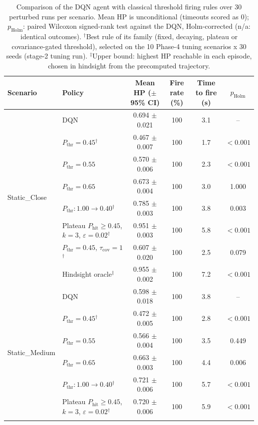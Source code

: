 \begin{table}[htbp]
\centering
\caption{Comparison of the DQN agent with classical threshold firing rules over 30 perturbed runs per scenario. Mean HP is unconditional (timeouts scored as 0); $p_{\mathrm{Holm}}$: paired Wilcoxon signed-rank test against the DQN, Holm-corrected (n/a: identical outcomes). $^{\dagger}$Best rule of its family (fixed, decaying, plateau or covariance-gated threshold), selected on the 10 Phase-4 tuning scenarios x 30 seeds (stage-2 tuning run). $^{\ddagger}$Upper bound: highest HP reachable in each episode, chosen in hindsight from the precomputed trajectory.}
\label{tab:comparison-traditional-rl}
\small
\begin{tabular}{llcccc}
\toprule
\textbf{Scenario} & \textbf{Policy} & \textbf{Mean HP ($\pm$95\% CI)} & \textbf{Fire rate (\%)} & \textbf{Time to fire (s)} & $p_{\mathrm{Holm}}$ \\
\midrule
\multirow{8}{*}{Static\_Close} & DQN & 0.694 $\pm$ 0.021 & 100 & 3.1 & -- \\
 & $P_{\mathrm{thr}}=0.45$$^{\dagger}$ & 0.467 $\pm$ 0.007 & 100 & 1.7 & $<0.001$ \\
 & $P_{\mathrm{thr}}=0.55$ & 0.570 $\pm$ 0.006 & 100 & 2.3 & $<0.001$ \\
 & $P_{\mathrm{thr}}=0.65$ & 0.673 $\pm$ 0.004 & 100 & 3.0 & 1.000 \\
 & $P_{\mathrm{thr}}: 1.00 \to 0.40$$^{\dagger}$ & 0.785 $\pm$ 0.003 & 100 & 3.8 & 0.003 \\
 & Plateau $P_{\mathrm{hit}}\geq0.45$, $k=3$, $\varepsilon=0.02$$^{\dagger}$ & 0.951 $\pm$ 0.003 & 100 & 5.8 & $<0.001$ \\
 & $P_{\mathrm{thr}}=0.45$, $\tau_{\mathrm{cov}}=1$$^{\dagger}$ & 0.607 $\pm$ 0.020 & 100 & 2.5 & 0.079 \\
 & Hindsight oracle$^{\ddagger}$ & 0.955 $\pm$ 0.002 & 100 & 7.2 & $<0.001$ \\
\midrule
\multirow{8}{*}{Static\_Medium} & DQN & 0.598 $\pm$ 0.018 & 100 & 3.8 & -- \\
 & $P_{\mathrm{thr}}=0.45$$^{\dagger}$ & 0.472 $\pm$ 0.005 & 100 & 2.8 & $<0.001$ \\
 & $P_{\mathrm{thr}}=0.55$ & 0.566 $\pm$ 0.004 & 100 & 3.5 & 0.449 \\
 & $P_{\mathrm{thr}}=0.65$ & 0.663 $\pm$ 0.003 & 100 & 4.4 & 0.006 \\
 & $P_{\mathrm{thr}}: 1.00 \to 0.40$$^{\dagger}$ & 0.721 $\pm$ 0.006 & 100 & 5.7 & $<0.001$ \\
 & Plateau $P_{\mathrm{hit}}\geq0.45$, $k=3$, $\varepsilon=0.02$$^{\dagger}$ & 0.720 $\pm$ 0.006 & 100 & 5.9 & $<0.001$ \\
$$
\end{tabular}
\end{table}
